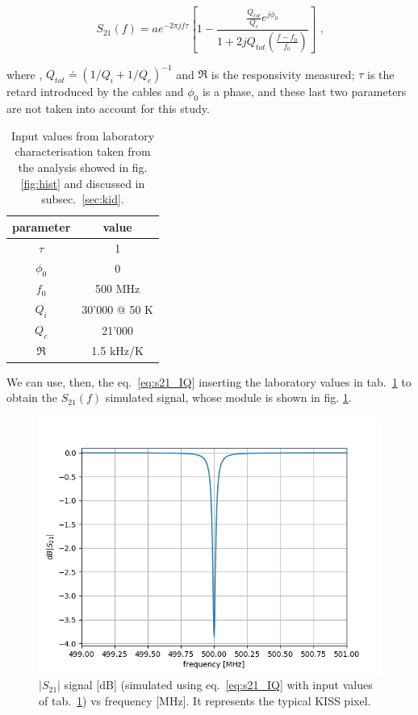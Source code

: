 \documentclass[twocolumn,traditabstract]{aa}\\
\begin{document}
\begin{equation}
S_{21}(f)=ae^{-2\pi j f \tau} \left[ 1-\frac{\frac{Q_{tot}}{Q_c}e^{j\phi_0}}{1+2jQ_{tot}\left(\frac{f-f_0}{f_0}\right)}\right] \text{ ,}
\label{eq:s21_IQ}
\end{equation}

\noindent where , $Q_{tot}\doteq\left( 1/Q_i + 1/Q_c \right)^{-1}$ and $\mathfrak{R}$ is the responsivity measured; $\tau$ is the retard introduced by the cables and $\phi_0$ is a phase, and these last two parameters are not taken into account for this study.

\begin{table}[htf]
	\footnotesize
	\centering
	\caption{Input values from laboratory characterisation taken from the analysis showed in fig. \ref{fig:hist} and discussed in subsec.~\ref{sec:kid}.}
	\begin{tabular}{cc}
		\toprule
		\textbf{parameter} & \textbf{value} \\
		\toprule
		$\tau$ & 1 \\ 
		\midrule 
		$\phi_0$ & 0 \\
		\midrule
		$f_0$ & 500 MHz \\  
		\midrule 
		$Q_i$ & 30'000 @ 50 K \\ 
		\midrule 
		$Q_c$ & 21'000 \\ 
		\midrule 
		$\mathfrak{R}$  & 1.5 kHz/K \\ 
		\bottomrule
	\end{tabular}
	\label{tab:s21_values}
\end{table}

\noindent We can use, then, the eq.~\ref{eq:s21_IQ} inserting the laboratory values in tab.~\ref{tab:s21_values} to obtain the $S_{21}(f)$ simulated signal, whose module is shown in fig. \ref{fig:s21_simu}.

\begin{figure}[htf]
	\centering
	\includegraphics[width=.5\textwidth]{3.acqui/resonance.png}
	\caption{$\left|S_{21} \right|$ signal [dB] (simulated using eq.~\ref{eq:s21_IQ} with input values of tab.~\ref{tab:s21_values}) vs frequency [MHz]. It represents the typical KISS pixel.}
	\label{fig:s21_simu}
\end{figure}
\end{document}
